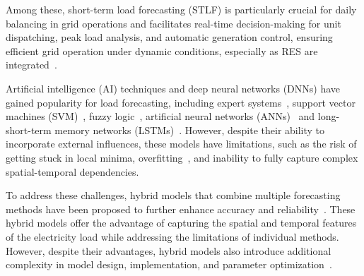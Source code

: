 \documentclass[sigconf,nonacm]{acmart}
\begin{document}
Among these, short-term load forecasting (STLF) is particularly crucial for daily balancing in grid operations and facilitates real-time decision-making for unit dispatching, peak load analysis, and automatic generation control, ensuring efficient grid operation under dynamic conditions, especially as RES are integrated~\cite{Zavadil2013, Dannecker2015, Kyriakides2007,Venayagamoorthy2012}.

Artificial intelligence (AI) techniques and deep neural networks (DNNs) have gained popularity for load forecasting, including expert systems~\cite{Rahman1988}, support vector machines (SVM)~\cite{Dong2022}, fuzzy logic~\cite{Pandian2006}, artificial neural networks (ANNs)~\cite{Kouhi2013} and long-short-term memory networks (LSTMs)~\cite{Jin2022}. However, despite their ability to incorporate external influences, these models have limitations, such as the risk of getting stuck in local minima, overfitting~\cite{Zhang2018}, and inability to fully capture complex spatial-temporal dependencies.

To address these challenges, hybrid models that combine multiple forecasting methods have been proposed to further enhance accuracy and reliability~\cite{Mamun2020,Eandi2022,Lin2021}. These hybrid models offer the advantage of capturing the spatial and temporal features of the electricity load while addressing the limitations of individual methods. However, despite their advantages, hybrid models also introduce additional complexity in model design, implementation, and parameter optimization~\cite{Mamun2020}.
\end{document}
